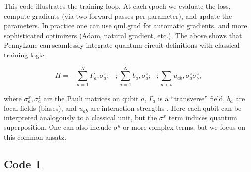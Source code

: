 \documentclass[%
oneside,                 %
final,                   %
10pt]{article}
\begin{document}
This code illustrates the training loop.  At each epoch we evaluate
the loss, compute gradients (via two forward passes per parameter),
and update the parameters.  In practice one can use qml.grad for
automatic gradients, and more sophisticated optimizers (Adam, natural
gradient, etc.). The above shows that PennyLane can seamlessly
integrate quantum circuit definitions with classical training logic.

\[
H = -\sum_{a=1}^N \Gamma_a,\sigma^x_a ;-;\sum_{a=1}^N b_a,\sigma^z_a ;-;\sum_{a<b} u_{ab},\sigma^z_a \sigma^z_b,
\]

where $\sigma_a^x,\sigma_a^z$ are the Pauli matrices on qubit $a$,
$\Gamma_a$ is a “transverse” field, $b_a$ are local fields (biases),
and $u_{ab}$ are interaction strengths .  Here each qubit can be
interpreted analogously to a classical unit, but the $\sigma^x$ term
induces quantum superposition.  One can also include $\sigma^y$ or
more complex terms, but we focus on this common ansatz.

\subsection*{Code 1}
\end{document}
